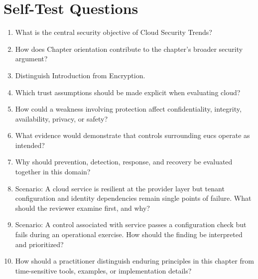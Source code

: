 \documentclass[11pt]{article}
\begin{document}
\section*{Self-Test Questions}
\begin{enumerate}
\item What is the central security objective of Cloud Security Trends?
\item How does Chapter orientation contribute to the chapter's broader security argument?
\item Distinguish Introduction from Encryption.
\item Which trust assumptions should be made explicit when evaluating cloud?
\item How could a weakness involving protection affect confidentiality, integrity, availability, privacy, or safety?
\item What evidence would demonstrate that controls surrounding eucs operate as intended?
\item Why should prevention, detection, response, and recovery be evaluated together in this domain?
\item Scenario: A cloud service is resilient at the provider layer but tenant configuration and identity dependencies remain single points of failure. What should the reviewer examine first, and why?
\item Scenario: A control associated with service passes a configuration check but fails during an operational exercise. How should the finding be interpreted and prioritized?
\item How should a practitioner distinguish enduring principles in this chapter from time-sensitive tools, examples, or implementation details?
\end{enumerate}
\end{document}
